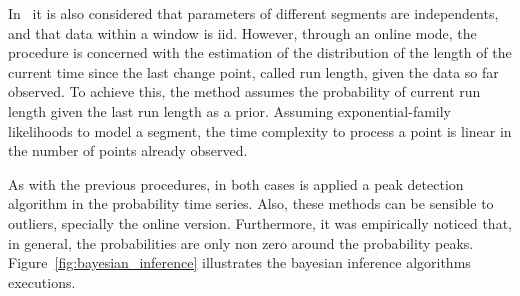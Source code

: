 In~\cite{bayesian_online_changepoint_detection} it is also considered that
parameters of different segments are independents, and that data within a
window is iid. However, through an online mode, the procedure is concerned with
the estimation of the distribution of the length of the current time since the
last change point, called run length, given the data so far observed. To achieve
this, the method assumes the probability of current run length given the last
run length as a prior. Assuming exponential-family likelihoods to model a
segment, the time complexity to process a point is linear in the number of
points already observed.

As with the previous procedures, in both cases is applied a peak detection
algorithm in the probability time series. Also,
these methods can be sensible to outliers, specially the
online version. Furthermore, it was empirically noticed that, in general, the
probabilities are only non zero around the probability peaks.
Figure~\ref{fig:bayesian_inference} illustrates the bayesian inference
algorithms executions.

